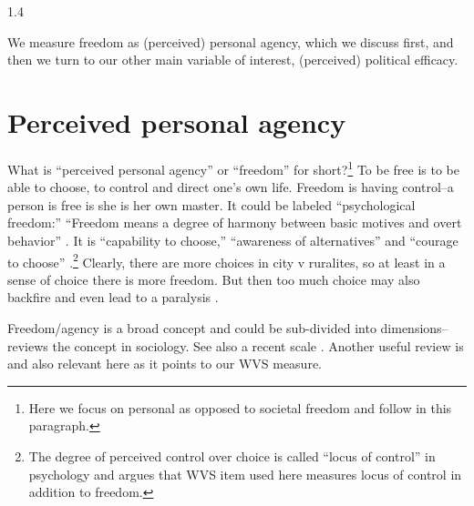 \documentclass[10pt, letterpaper]{article}
\begin{document}
\begin{spacing}{1.4}

 We measure freedom as (perceived) personal agency, which we discuss first, and
 then we turn to our other main variable of interest, (perceived) political
 efficacy.  

\section{Perceived personal agency %
}
 
 
What is ``perceived personal agency'' or ``freedom'' for short?\footnote{Here we focus on personal as opposed to
  societal freedom and follow \citet{aok_free_from_to} in this paragraph.} To be free is to be able to choose, to control and
direct one's own life. Freedom is having control--a person is free is she is her
own master. 
 It could be labeled ``psychological freedom:'' ``Freedom means a degree of harmony
between basic motives and overt behavior'' \citep[Bay 1970, p.83 cited in][]{aok_free_from_to}.
 It is ``capability to choose,'' ``awareness of alternatives'' and ``courage to
 choose'' \citep{veenhoven00_b}.\footnote{The degree of perceived control over choice is called ``locus of control'' in
 psychology and \citet{verme09} argues that WVS item used here measures locus of
 control in addition to freedom.}
 Clearly, there are more choices in city v
ruralites, so at least in a sense of choice there is more freedom. But then too much choice may
 also backfire and even lead to a paralysis \citep{schwartz04}.

Freedom/agency is a broad concept and could be sub-divided into dimensions--\citet{hitlin09} reviews the concept in sociology. 
See also a recent scale \citep{agencyScale25}. Another useful review is
\citet{kouba16} and also relevant here as it points to our WVS measure.



\end{spacing}
\end{document}
